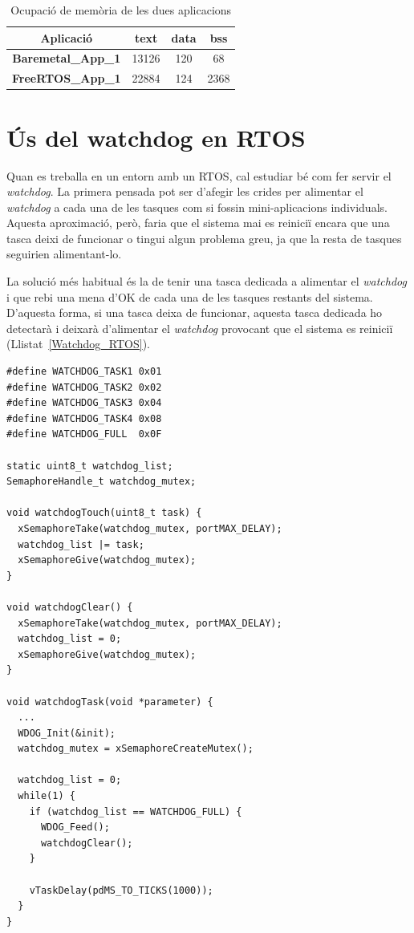 \begin{table}[!htbp]
\caption{Ocupació de memòria de les dues aplicacions}
\centering
\begin{tabular}{|c|c|c|c|}
\hline
{\bf Aplicació} & {\bf text} & {\bf data} & {\bf bss}\\
\hline
{\bf Baremetal\_App\_1} & 13126 & 120 & 68\\
\hline
{\bf FreeRTOS\_App\_1} & 22884 & 124 & 2368\\
\hline
\end{tabular}
\label{tb:bin_size}
\end{table}


\chapter{Ús del {\bf watchdog} en RTOS}
Quan es treballa en un entorn amb un RTOS, cal estudiar bé com fer servir el {\em watchdog}. La primera pensada pot ser d'afegir les crides per alimentar el {\em watchdog} a cada una de les tasques com si fossin mini-aplicacions individuals. Aquesta aproximació, però, faria que el sistema mai es reiniciï encara que una tasca deixi de funcionar o tingui algun problema greu, ja que la resta de tasques seguirien alimentant-lo.

La solució més habitual és la de tenir una tasca dedicada a alimentar el {\em watchdog} i que rebi una mena d'OK de cada una de les tasques restants del sistema. D'aquesta forma, si una tasca deixa de funcionar, aquesta tasca dedicada ho detectarà i deixarà d'alimentar el {\em watchdog} provocant que el sistema es reiniciï (Llistat~\ref{Watchdog_RTOS}).

\begin{lstlisting}[style=customc,caption={Codi d'exemple de la tasca de control del {\bf watchdog}},label=Watchdog_RTOS]
#define WATCHDOG_TASK1 0x01
#define WATCHDOG_TASK2 0x02
#define WATCHDOG_TASK3 0x04
#define WATCHDOG_TASK4 0x08
#define WATCHDOG_FULL  0x0F

static uint8_t watchdog_list;
SemaphoreHandle_t watchdog_mutex;

void watchdogTouch(uint8_t task) {
  xSemaphoreTake(watchdog_mutex, portMAX_DELAY);
  watchdog_list |= task;
  xSemaphoreGive(watchdog_mutex);
}

void watchdogClear() {
  xSemaphoreTake(watchdog_mutex, portMAX_DELAY);
  watchdog_list = 0;
  xSemaphoreGive(watchdog_mutex);
}

void watchdogTask(void *parameter) {
  ...
  WDOG_Init(&init);
  watchdog_mutex = xSemaphoreCreateMutex();

  watchdog_list = 0;
  while(1) {
    if (watchdog_list == WATCHDOG_FULL) {
      WDOG_Feed();
      watchdogClear();      
    } 

    vTaskDelay(pdMS_TO_TICKS(1000));
  }
}
\end{lstlisting}

